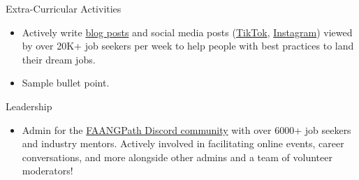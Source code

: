 \documentclass{resume} %
\begin{document}
\begin{rSection}{Extra-Curricular Activities} 
\begin{itemize}
    \item 	Actively write \href{https://www.faangpath.com/blog/}{blog posts} and social media posts (\href{https://www.tiktok.com/@faangpath}{TikTok}, \href{https://www.instagram.com/faangpath/?hl=en}{Instagram}) viewed by over 20K+ job seekers per week to help people with best practices to land their dream jobs. 
    \item	Sample bullet point.
\end{itemize}


\end{rSection}

\begin{rSection}{Leadership} 
\begin{itemize}
    \item Admin for the \href{https://discord.com/invite/WWbjEaZ}{FAANGPath Discord community} with over 6000+ job seekers and industry mentors. Actively involved in facilitating online events, career conversations, and more alongside other admins and a team of volunteer moderators! 
\end{itemize}


\end{rSection}
\end{document}
